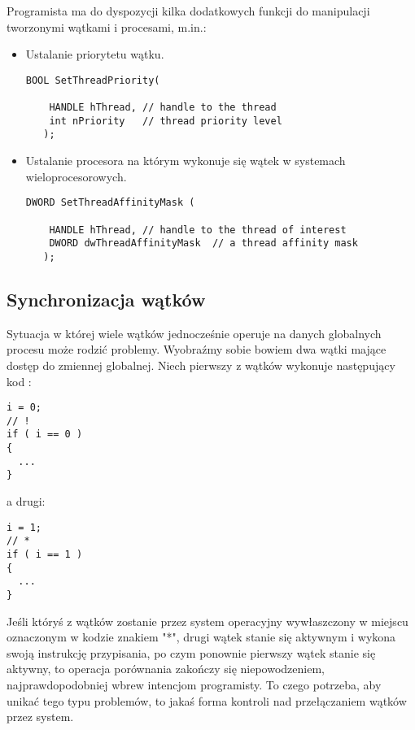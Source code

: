 Programista ma do dyspozycji kilka dodatkowych funkcji do manipulacji tworzonymi wątkami
i procesami, m.in.:

\begin{itemize}
\item Ustalanie priorytetu wątku.
\begin{scriptsize}
\begin{verbatim}
BOOL SetThreadPriority(

    HANDLE hThread,	// handle to the thread 
    int nPriority 	// thread priority level 
   );
\end{verbatim}
\end{scriptsize}

\item Ustalanie procesora na którym wykonuje się wątek w systemach wieloprocesorowych.
\begin{scriptsize}
\begin{verbatim}
DWORD SetThreadAffinityMask (

    HANDLE hThread,	// handle to the thread of interest
    DWORD dwThreadAffinityMask	// a thread affinity mask
   );
\end{verbatim}
\end{scriptsize}

\end{itemize}

\subsection{Synchronizacja wątków}

Sytuacja w której wiele wątków jednocześnie operuje na danych globalnych procesu może 
rodzić problemy. Wyobraźmy sobie bowiem dwa wątki mające dostęp do zmiennej globalnej.
Niech pierwszy z wątków wykonuje następujący kod :

\begin{scriptsize}
\begin{verbatim}
i = 0;	
// !
if ( i == 0 )
{
  ...
}
\end{verbatim}
\end{scriptsize}

a drugi:

\begin{scriptsize}
\begin{verbatim}
i = 1;
// *
if ( i == 1 )
{
  ...
}
\end{verbatim}
\end{scriptsize}

Jeśli któryś z wątków zostanie przez system operacyjny wywłaszczony w miejscu oznaczonym w kodzie znakiem "*",
drugi wątek stanie się aktywnym i wykona swoją instrukcję przypisania, po czym ponownie pierwszy wątek
stanie się aktywny, to operacja porównania zakończy się niepowodzeniem, najprawdopodobniej wbrew intencjom 
programisty. To czego potrzeba, aby unikać tego typu problemów, to jakaś forma kontroli nad przełączaniem
wątków przez system.


